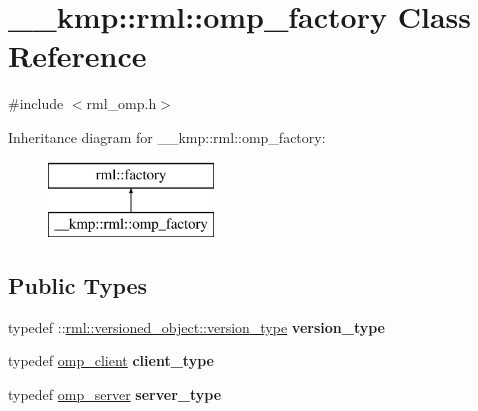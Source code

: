 \hypertarget{class____kmp_1_1rml_1_1omp__factory}{}\section{\+\_\+\+\_\+kmp\+:\+:rml\+:\+:omp\+\_\+factory Class Reference}
\label{class____kmp_1_1rml_1_1omp__factory}


{\ttfamily \#include $<$rml\+\_\+omp.\+h$>$}

Inheritance diagram for \+\_\+\+\_\+kmp\+:\+:rml\+:\+:omp\+\_\+factory\+:\begin{figure}[H]
\begin{center}
\leavevmode
\includegraphics[height=2.000000cm]{class____kmp_1_1rml_1_1omp__factory}
\end{center}
\end{figure}
\subsection*{Public Types}
\begin{DoxyCompactItemize}
\item 
\hypertarget{class____kmp_1_1rml_1_1omp__factory_a9ade40ff9544fdd96df50c979b4669c3}{}typedef \+::\hyperlink{classrml_1_1versioned__object_a759650010b271238ef9433442730c423}{rml\+::versioned\+\_\+object\+::version\+\_\+type} {\bfseries version\+\_\+type}\label{class____kmp_1_1rml_1_1omp__factory_a9ade40ff9544fdd96df50c979b4669c3}

\item 
\hypertarget{class____kmp_1_1rml_1_1omp__factory_a8dbc6c699a278d79accf5b9a3512a2cc}{}typedef \hyperlink{class____kmp_1_1rml_1_1omp__client}{omp\+\_\+client} {\bfseries client\+\_\+type}\label{class____kmp_1_1rml_1_1omp__factory_a8dbc6c699a278d79accf5b9a3512a2cc}

\item 
\hypertarget{class____kmp_1_1rml_1_1omp__factory_ab77a59db26accce8b3090cd9a2605d23}{}typedef \hyperlink{class____kmp_1_1rml_1_1omp__server}{omp\+\_\+server} {\bfseries server\+\_\+type}\label{class____kmp_1_1rml_1_1omp__factory_ab77a59db26accce8b3090cd9a2605d23}

\end{DoxyCompactItemize}
